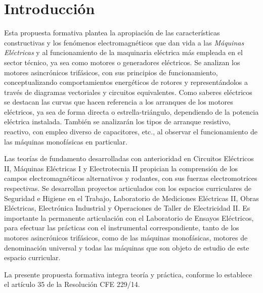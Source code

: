 \documentclass[../main]{subfiles}
\begin{document}
\chapter*{Introducción}
Esta propuesta formativa plantea la apropiación de las características
constructivas y los fenómenos electromagnéticos que dan vida a las
\emph{Máquinas
Eléctricas} y al funcionamiento de la maquinaria eléctrica más
empleada en el sector
técnico, ya sea como motores o generadores eléctricos. Se analizan los motores
asincrónicos trifásicos, con sus principios de funcionamiento, conceptualizando
comportamientos energéticos de rotores y representándolos a través de diagramas
vectoriales y circuitos equivalentes. Como saberes eléctricos se
destacan las curvas
que hacen referencia a los arranques de los motores eléctricos, ya sea de forma
directa o estrella-triángulo, dependiendo de la potencia eléctrica
instalada. También se
analizarán los tipos de arranque resistivo, reactivo, con empleo
diverso de capacitores,
etc., al observar el funcionamiento de las máquinas monofásicas en particular.

Las teorías de fundamento desarrolladas con anterioridad en Circuitos
Eléctricos II, Máquinas Eléctricas I y Electrotecnia II propician la
comprensión de los
campos electromagnéticos alternativos y rodantes, con sus fuerzas
electromotrices
respectivas. Se desarrollan proyectos articulados con los espacios curriculares
de Seguridad e Higiene en el Trabajo, Laboratorio de Mediciones
Eléctricas II, Obras
Eléctricas, Electrónica Industrial y Operaciones de Taller de
Electricidad II. Es
importante la permanente articulación con el Laboratorio de Ensayos
Eléctricos, para
efectuar las prácticas con el instrumental correspondiente, tanto de los motores
asincrónicos trifásicos, como de las máquinas monofásicas, motores de
denominación
universal y todas las máquinas que son objeto de estudio de este
espacio curricular.

La presente propuesta formativa integra teoría y práctica, conforme lo
establece el artículo 35 de la Resolución CFE 229/14.
\end{document}
